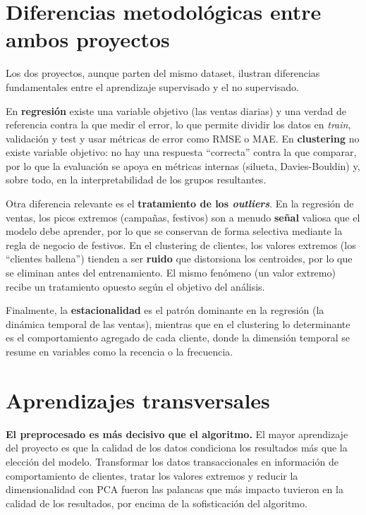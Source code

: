 \documentclass[11pt,a4paper]{article}
\begin{document}
\section{Diferencias metodológicas entre ambos proyectos}

Los dos proyectos, aunque parten del mismo dataset, ilustran diferencias fundamentales entre el aprendizaje supervisado y el no supervisado.

En \textbf{regresión} existe una variable objetivo (las ventas diarias) y una verdad de referencia contra la que medir el error, lo que permite dividir los datos en \textit{train}, validación y test y usar métricas de error como RMSE o MAE. En \textbf{clustering} no existe variable objetivo: no hay una respuesta ``correcta'' contra la que comparar, por lo que la evaluación se apoya en métricas internas (silueta, Davies-Bouldin) y, sobre todo, en la interpretabilidad de los grupos resultantes.

Otra diferencia relevante es el \textbf{tratamiento de los \textit{outliers}}. En la regresión de ventas, los picos extremos (campañas, festivos) son a menudo \textbf{señal} valiosa que el modelo debe aprender, por lo que se conservan de forma selectiva mediante la regla de negocio de festivos. En el clustering de clientes, los valores extremos (los ``clientes ballena'') tienden a ser \textbf{ruido} que distorsiona los centroides, por lo que se eliminan antes del entrenamiento. El mismo fenómeno (un valor extremo) recibe un tratamiento opuesto según el objetivo del análisis.

Finalmente, la \textbf{estacionalidad} es el patrón dominante en la regresión (la dinámica temporal de las ventas), mientras que en el clustering lo determinante es el comportamiento agregado de cada cliente, donde la dimensión temporal se resume en variables como la recencia o la frecuencia.

\section{Aprendizajes transversales}

\textbf{El preprocesado es más decisivo que el algoritmo.} El mayor aprendizaje del proyecto es que la calidad de los datos condiciona los resultados más que la elección del modelo. Transformar los datos transaccionales en información de comportamiento de clientes, tratar los valores extremos y reducir la dimensionalidad con PCA fueron las palancas que más impacto tuvieron en la calidad de los resultados, por encima de la sofisticación del algoritmo.
\end{document}
